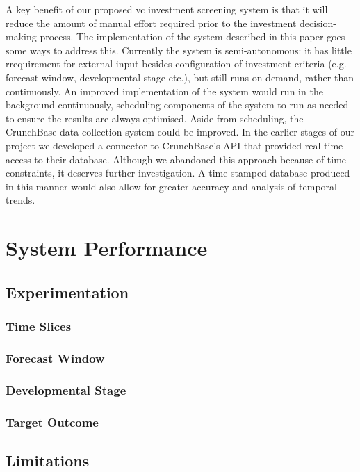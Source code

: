 \documentclass[../thesis/thesis.tex]{subfiles}
\begin{document}
A key benefit of our proposed \gls{vc} investment screening system is that it will reduce the amount of manual effort required prior to the investment decision-making process. The implementation of the system described in this paper goes some ways to address this. Currently the system is semi-autonomous: it has little rrequirement for external input besides configuration of investment criteria (e.g. forecast window, developmental stage etc.), but still runs on-demand, rather than continuously. An improved implementation of the system would run in the background continuously, scheduling components of the system to run as needed to ensure the results are always optimised. Aside from scheduling, the CrunchBase data collection system could be improved. In the earlier stages of our project we developed a connector to CrunchBase's API that provided real-time access to their database. Although we abandoned this approach because of time constraints, it deserves further investigation. A time-stamped database produced in this manner would also allow for greater accuracy and analysis of temporal trends.

\section{System Performance} %

\subsection{Experimentation} %

\subsubsection{Time Slices} %
\subsubsection{Forecast Window} %
\subsubsection{Developmental Stage} %
\subsubsection{Target Outcome} %

\subsection{Limitations} %
\end{document}
